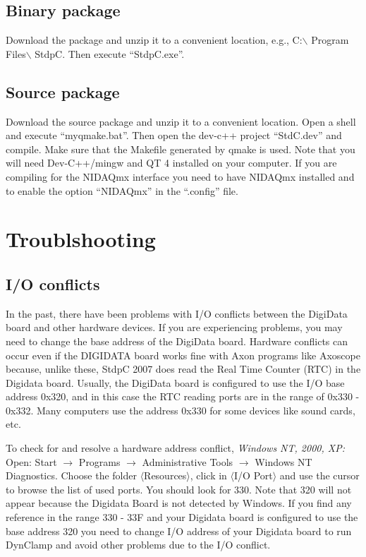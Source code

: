 \documentclass{article}
\begin{document}
\subsection{Binary package}
Download the package and unzip it to a convenient location, e.g.,
C:$\backslash$ Program Files$\backslash$ StdpC. Then execute ``StdpC.exe''.

\subsection{Source package}
Download the source package and unzip it to a convenient
location. Open a shell and execute ``myqmake.bat''. Then open the
dev-c++ project ``StdC.dev'' and compile. Make sure that the Makefile
generated by qmake is used. Note that you will need Dev-C++/mingw and
QT 4 installed on your computer. If you are compiling for the NIDAQmx
interface you need to have NIDAQmx installed and to enable the option ``NIDAQmx'' in the ``.config'' file.

\section{Troublshooting}
\subsection{I/O conflicts}
 
In the past, there have been problems with I/O conflicts between the
DigiData board and other hardware devices. If you are experiencing
problems, you may need to change the base address of the DigiData
board. Hardware conflicts can occur even if the DIGIDATA board works
fine with Axon programs like Axoscope because, unlike these, StdpC
2007 does read the Real Time Counter (RTC) in the Digidata
board. Usually, the DigiData board is configured to use the I/O base
address 0x320, and in this case the RTC reading ports are in the range
of 0x330 - 0x332. Many computers use the address 0x330 for some devices like
sound cards, etc.

To check for and resolve a hardware address conflict,
\noindent
{\em Windows NT, 2000, XP: } \\
Open: Start $\rightarrow$ Programs $\rightarrow$ Administrative Tools
$\rightarrow$ Windows NT Diagnostics. Choose the folder
$\langle$Resources$\rangle$, click in $\langle$I/O Port$\rangle$ and use the
cursor to browse the list of used ports.  You should look for 330. Note that
320 will not appear because the Digidata Board is not detected by Windows. If
you find any reference in the range 330 - 33F and your Digidata board is
configured to use the base address 320 you need to change I/O address of your
Digidata board to run DynClamp and avoid other problems due to the I/O
conflict.
\end{document}
